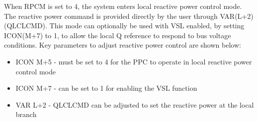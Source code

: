 \documentclass{../grid-link-report}
\begin{document}
When RPCM is set to 4, the system enters local reactive power control mode. The reactive power command is provided directly by the user through VAR(L+2) (QLCLCMD). This mode can optionally be used with VSL enabled, by setting ICON(M+7) to 1, to allow the local Q reference to respond to bus voltage conditions. Key parameters to adjust reactive power control are shown below:

\begin{itemize}
	\item ICON M+5 - must be set to 4 for the PPC to operate in local reactive power control mode
	\item ICON M+7 - can be set to 1 for enabling the VSL function
	\item VAR L+2 - QLCLCMD can be adjusted to set the reactive power at the local branch
\end{itemize}

	\makebackpage
	
	
	
	
	
	
	
\end{document}
